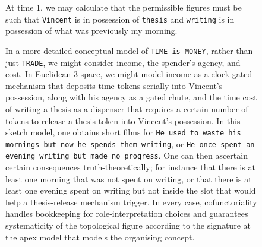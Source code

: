 \begin{example}
\begin{figure}[h]
\end{figure}
\begin{figure}[h]\label{fig:time1}
\centering
{}
\caption{At time 1, we may calculate that the permissible figures must be such that \texttt{Vincent} is in possession of \texttt{thesis} and \texttt{writing} is in possession of what was previously my morning.}
\end{figure}
\begin{figure}[h]\label{fig:fullermodel}
\centering
{}
\caption{In a more detailed conceptual model of \texttt{TIME is MONEY}, rather than just \texttt{TRADE}, we might consider income, the spender's agency, and cost. In Euclidean 3-space, we might model income as a clock-gated mechanism that deposits time-tokens serially into Vincent's possession, along with his agency as a gated chute, and the time cost of writing a thesis as a dispenser that requires a certain number of tokens to release a thesis-token into Vincent's possession. In this sketch model, one obtains short films for \texttt{He used to waste his mornings but now he spends them writing}, or \texttt{He once spent an evening writing but made no progress}. One can then ascertain certain consequences truth-theoretically; for instance that there is at least one morning that was not spent on writing, or that there is at least one evening spent on writing but not inside the slot that would help a thesis-release mechanism trigger. In every case, cofunctoriality handles bookkeeping for role-interpretation choices and guarantees systematicity of the topological figure according to the signature at the apex model that models the organising concept.}
\end{figure}
\end{example}